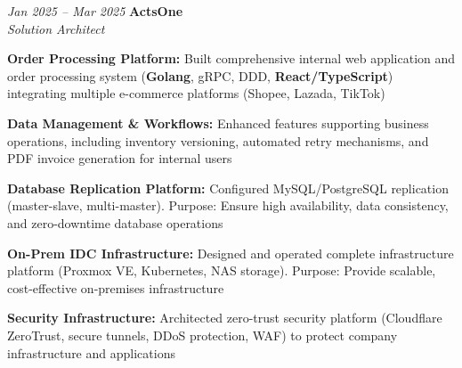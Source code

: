 \begin{twocolentry}{\textit{Jan 2025 -- Mar 2025}}
    \textbf{ActsOne} \\[4pt]
    \textit{Solution Architect}
\end{twocolentry}
\begin{onecolentry}
    \begin{highlights}
        \item \textbf{Order Processing Platform:} Built comprehensive internal web application and order processing system (\textbf{Golang}, gRPC, DDD, \textbf{React/TypeScript}) integrating multiple e-commerce platforms (Shopee, Lazada, TikTok)
        \item \textbf{Data Management \& Workflows:} Enhanced features supporting business operations, including inventory versioning, automated retry mechanisms, and PDF invoice generation for internal users
        \item \textbf{Database Replication Platform:} Configured MySQL/PostgreSQL replication (master-slave, multi-master). Purpose: Ensure high availability, data consistency, and zero-downtime database operations
        \item \textbf{On-Prem IDC Infrastructure:} Designed and operated complete infrastructure platform (Proxmox VE, Kubernetes, NAS storage). Purpose: Provide scalable, cost-effective on-premises infrastructure
        \item \textbf{Security Infrastructure:} Architected zero-trust security platform (Cloudflare ZeroTrust, secure tunnels, DDoS protection, WAF) to protect company infrastructure and applications
    \end{highlights}
\end{onecolentry}
\vspace{0.2 cm}

